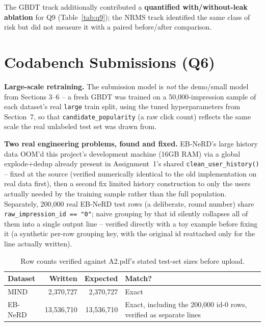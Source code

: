 \documentclass[11pt,a4paper]{article}
\begin{document}
The GBDT track additionally contributed a \textbf{quantified with/without-leak
ablation} for Q9 (Table~\ref{tab:q9}); the NRMS track identified the same class of risk
but did not measure it with a paired before/after comparison.

\section{Codabench Submissions (Q6)}

\textbf{Large-scale retraining.} The submission model is \emph{not} the demo/small
model from Sections 3--6 -- a fresh GBDT was trained on a 50{,}000-impression sample of
each dataset's real \texttt{large} train split, using the tuned hyperparameters from
Section~7, so that \texttt{candidate\_popularity} (a raw click count) reflects the same
scale the real unlabeled test set was drawn from.

\textbf{Two real engineering problems, found and fixed.} EB-NeRD's large history data
OOM'd this project's development machine (16GB RAM) via a global explode+dedup already
present in Assignment~1's shared \texttt{clean\_user\_history()} -- fixed at the source
(verified numerically identical to the old implementation on real data first), then a
second fix limited history construction to only the users actually needed by the
training sample rather than the full population. Separately, 200{,}000 real EB-NeRD
test rows (a deliberate, round number) share \texttt{raw\_impression\_id == "0"};
naive grouping by that id silently collapses all of them into a single output line --
verified directly with a toy example before fixing it (a synthetic per-row grouping key,
with the original id reattached only for the line actually written).

\begin{table}[h]
\centering\small
\begin{tabularx}{\textwidth}{l r r X}
\toprule
\textbf{Dataset} & \textbf{Written} & \textbf{Expected} & \textbf{Match?} \\
\midrule
MIND    & 2{,}370{,}727  & 2{,}370{,}727  & Exact \\
EB-NeRD & 13{,}536{,}710 & 13{,}536{,}710 & Exact, including the 200{,}000 id-0 rows, verified as separate lines \\
\bottomrule
\end{tabularx}
\caption{Row counts verified against A2.pdf's stated test-set sizes before upload.}
\end{table}
\end{document}
